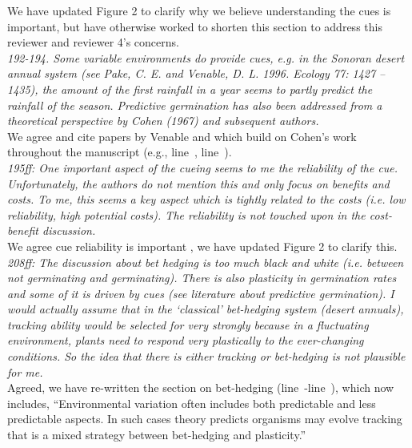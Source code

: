 \documentclass[11pt]{article}
\newcommand{\lr}[1]{line~\lineref{#1}}
\begin{document}
We have updated Figure 2 to clarify why we believe understanding the cues is important, but have otherwise worked to shorten this section to address this reviewer and reviewer 4's concerns. \\

\emph{192-194. Some variable environments do provide cues, e.g. in the Sonoran desert annual system
(see Pake, C. E. and Venable, D. L. 1996. Ecology 77: 1427 – 1435), the amount of the first
rainfall in a year seems to partly predict the rainfall of the season. Predictive germination
has also been addressed from a theoretical perspective by Cohen (1967) and subsequent
authors.}\\

We agree and cite papers by Venable and which build on Cohen's work throughout the manuscript (e.g., \lr{r1ass2}, \lr{r1ass4}).\\

\emph{195ff: One important aspect of the cueing seems to me the reliability of the cue.
Unfortunately, the authors do not mention this and only focus on benefits and costs. To me,
this seems a key aspect which is tightly related to the costs (i.e. low reliability, high
potential costs). The reliability is not touched upon in the cost-benefit discussion.}\\

We agree cue reliability is important \citep[though we follow][in considering it a constraint]{}, we have updated Figure 2 to clarify this. \\

\emph{208ff: The discussion about bet hedging is too much black and white (i.e. between not
germinating and germinating). There is also plasticity in germination rates and some of it is
driven by cues (see literature about predictive germination). I would actually assume that in
the ‘classical’ bet-hedging system (desert annuals), tracking ability would be selected for
very strongly because in a fluctuating environment, plants need to respond very plastically
to the ever-changing conditions. So the idea that there is either tracking or bet-hedging is
not plausible for me.}\\

Agreed, we have re-written the section on bet-hedging (\lr{bhS}-\lr{bhE}), which now includes, ``Environmental variation often includes both predictable and less predictable aspects. In such cases theory predicts organisms may evolve tracking that is a mixed strategy between bet-hedging and plasticity.'' \\
\end{document}
